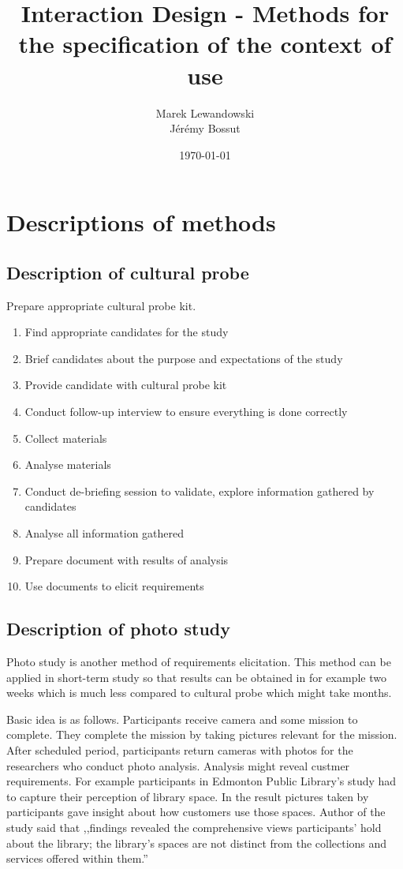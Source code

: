 \documentclass[12pt, a4paper]{article}
\author{Marek Lewandowski \\ Jérémy Bossut}
\date{\today}
\title{Interaction Design - Methods for the specification of the context of use}
\begin{document}
\maketitle
\newpage

\section{Descriptions of methods}

\subsection{Description of cultural probe}

Prepare appropriate cultural probe kit.

\begin{enumerate}
\item Find appropriate candidates for the study
\item Brief candidates about the purpose and expectations of the study
\item Provide candidate with cultural probe kit
\item Conduct follow-up interview to ensure everything is done correctly
\item Collect materials
\item Analyse materials
\item Conduct de-briefing session to validate, explore information gathered by candidates
\item Analyse all information gathered
\item Prepare document with results of analysis
\item Use documents to elicit requirements
\end{enumerate}

\subsection{Description of photo study}
Photo study is another method of requirements elicitation. This method can be applied in short-term study so that results can be obtained in for example two weeks which is much less compared to cultural probe which might take months.

Basic idea is as follows. Participants receive camera and some mission to complete. They complete the mission by taking pictures relevant for the mission. After scheduled period, participants return cameras with photos for the researchers who conduct photo analysis. Analysis might reveal custmer requirements. For example participants in Edmonton Public Library's study\cite{photostudyExample} had to capture their perception of library space. In the result pictures taken by participants gave insight about how customers use those spaces. Author of the study said that ,,findings revealed the comprehensive views participants’ hold about the library; the 
library’s spaces are not distinct from the collections and services offered within them.'' 
\end{document}
